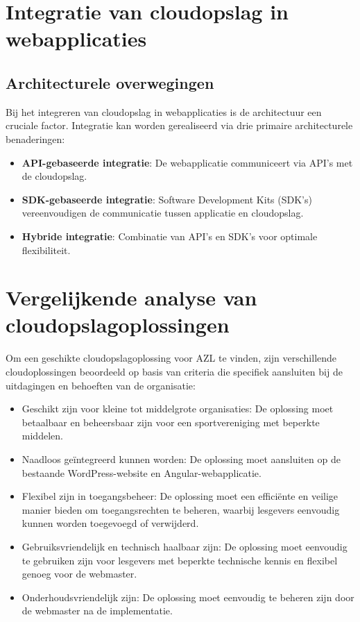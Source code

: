 \section{Integratie van cloudopslag in webapplicaties}
\subsection{Architecturele overwegingen}
Bij het integreren van cloudopslag in webapplicaties is de architectuur een cruciale factor. Integratie kan worden gerealiseerd via drie primaire architecturele benaderingen:
\begin{itemize}
  \item \textbf{API-gebaseerde integratie}: De webapplicatie communiceert via API's met de cloudopslag.
  \item \textbf{SDK-gebaseerde integratie}: Software Development Kits (SDK's) vereenvoudigen de communicatie tussen applicatie en cloudopslag.
  \item \textbf{Hybride integratie}: Combinatie van API's en SDK's voor optimale flexibiliteit.
\end{itemize}

\section{Vergelijkende analyse van cloudopslagoplossingen}
Om een geschikte cloudopslagoplossing voor AZL te vinden, zijn verschillende cloudoplossingen beoordeeld op basis van criteria die specifiek aansluiten bij de uitdagingen en behoeften van de organisatie:
\begin{itemize}
    \item Geschikt zijn voor kleine tot middelgrote organisaties: De oplossing moet betaalbaar en beheersbaar zijn voor een sportvereniging met beperkte middelen.
    \item Naadloos geïntegreerd kunnen worden: De oplossing moet aansluiten op de bestaande WordPress-website en Angular-webapplicatie.
    \item Flexibel zijn in toegangsbeheer: De oplossing moet een efficiënte en veilige manier bieden om toegangsrechten te beheren, waarbij lesgevers eenvoudig kunnen worden toegevoegd of verwijderd.
    \item Gebruiksvriendelijk en technisch haalbaar zijn: De oplossing moet eenvoudig te gebruiken zijn voor lesgevers met beperkte technische kennis en flexibel genoeg voor de webmaster.
    \item Onderhoudsvriendelijk zijn: De oplossing moet eenvoudig te beheren zijn door de webmaster na de implementatie.
\end{itemize}

